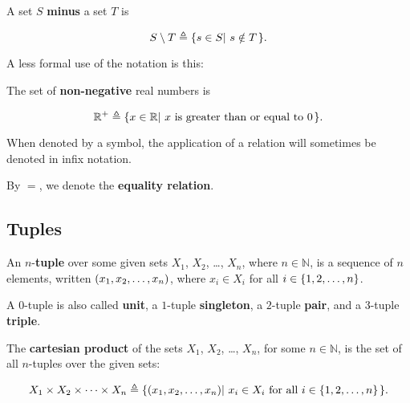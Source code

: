 \begin{definition} A set $S$ \textbf{minus} a set $T$ is

$$S\setminus T \triangleq \mathopen{}\left\{{s\in S\mathopen{}\left|\ {s\notin T}\right.\mathclose{}}\right\}\mathclose{}.$$

\end{definition}

A less formal use of the notation is this:

\begin{definition} The set of \textbf{non-negative} real numbers is

$$\mathbb{R}^+ \triangleq \mathopen{}\left\{{ x\in\mathbb{R} \mathopen{}\left|\ {\text{$x$ is greater than or
equal to $0$}}\right.\mathclose{}}\right\}\mathclose{}.$$

\end{definition}

\begin{notation} When denoted by a symbol, the application of a relation will
sometimes be denoted in infix notation. \end{notation}

\begin{notation} By $=$, we denote the \textbf{equality relation}.
\end{notation}

\subsection{Tuples}

\begin{definition} An $n$-\textbf{tuple} over some given sets $X_1$, $X_2$,
\ldots, $X_n$, where $n\in\mathbb{N}$, is a sequence of $n$ elements, written
$\mathopen{}\left({x_1,x_2,\ldots,x_n}\right)\mathclose{}$, where $x_i\in X_i$ for all $i\in\mathopen{}\left\{{1,2,\ldots, n}\right\}\mathclose{}$.
\end{definition}

\begin{definition} A $0$-tuple is also called \textbf{unit}, a $1$-tuple
\textbf{singleton}, a $2$-tuple \textbf{pair}, and a 3-tuple \textbf{triple}.
\end{definition}

\begin{definition} The \textbf{cartesian product} of the sets $X_1$, $X_2$,
\ldots, $X_n$, for some $n\in\mathbb{N}$, is the set of all $n$-tuples over the
given sets:

$$X_1\times X_2\times \cdots \times X_n \triangleq
\mathopen{}\left\{{\mathopen{}\left({x_1,x_2,\ldots,x_n}\right)\mathclose{}\mathopen{}\left|\ { \text{$x_i\in X_i$ for all
$i\in\mathopen{}\left\{{1,2,\ldots, n}\right\}\mathclose{}$}}\right.\mathclose{}}\right\}\mathclose{}.$$

\end{definition}

